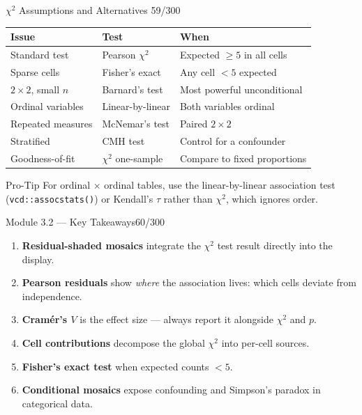 \documentclass[10pt]{beamer}
\newcommand{\smark}[1]{\hfill{\scriptsize\color{codegray}#1}}
\begin{document}
\begin{frame}{$\chi^2$ Assumptions and Alternatives}
\smark{59/300}
\centering\small
\begin{tabular}{@{}lll@{}}
    \toprule
    \textbf{Issue} & \textbf{Test} & \textbf{When} \\
    \midrule
    Standard test           & Pearson $\chi^2$            & Expected $\geq 5$ in all cells \\
    Sparse cells            & Fisher's exact              & Any cell $< 5$ expected \\
    $2 \times 2$, small $n$ & Barnard's test              & Most powerful unconditional \\
    Ordinal variables       & Linear-by-linear            & Both variables ordinal \\
    Repeated measures       & McNemar's test              & Paired $2 \times 2$ \\
    Stratified              & CMH test                    & Control for a confounder \\
    Goodness-of-fit         & $\chi^2$ one-sample         & Compare to fixed proportions \\
    \bottomrule
\end{tabular}

\vspace{0.3cm}
\begin{alertblock}{Pro-Tip}
    \scriptsize For ordinal $\times$ ordinal tables, use the linear-by-linear association test (\texttt{vcd::assocstats()}) or Kendall's $\tau$ rather than $\chi^2$, which ignores order.
\end{alertblock}
\end{frame}

\begin{frame}{Module 3.2 --- Key Takeaways}\smark{60/300}
\begin{enumerate}
    \item \textbf{Residual-shaded mosaics} integrate the $\chi^2$ test result directly into the display.
    \item \textbf{Pearson residuals} show \emph{where} the association lives: which cells deviate from independence.
    \item \textbf{Cramér's $V$} is the effect size --- always report it alongside $\chi^2$ and $p$.
    \item \textbf{Cell contributions} decompose the global $\chi^2$ into per-cell sources.
    \item \textbf{Fisher's exact test} when expected counts $< 5$.
    \item \textbf{Conditional mosaics} expose confounding and Simpson's paradox in categorical data.
\end{enumerate}
\end{frame}
\end{document}
